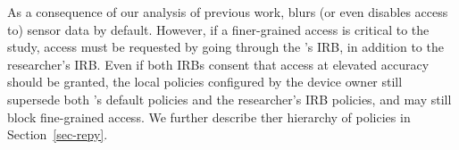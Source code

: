 \begin{comment}
\textbf{Default and customizable policies.}
For sensors of low and moderate risk, the default policies are listed in 
Table~\ref{tab:default}. Our principle to design the the default policies 
is that a device or its owner cannot be identifiable, but research projects
are allowed to get data at a level that is meaningful. For example, Bluetooth
and WiFi network MAC addresses can uniquely identify a device, therefore, 
the default policy for these sensor data is to return randomized MAC 
addresses to an experiment, as in~\cite{aditya2014encore}, and ther is 
mandatory (marked by N/A). For research projects that are interested 
in monitoring human activity, wireless network performance, etc., sensor
values are allowed to the granularity that is safe. Some data can be 
accessed at full precision (cellular signal strength, WiFi link speed), 
whereas others have an upper bound on their access frequency. 
\yanyan{how to add frequency to the table?}

\end{comment}


As a consequence of our analysis of previous work, \sysname blurs (or 
even disables access to) sensor data by default.
However, if a finer-grained access is critical to the study, access 
must be requested by going through the \sysname's IRB, in addition to the 
researcher's IRB. Even if both IRBs consent that access at elevated accuracy 
should be granted, the local policies configured by the device owner still 
supersede both \sysname's default policies and the researcher's IRB policies, 
and may still block fine-grained access. We further describe ther hierarchy 
of policies in Section~\ref{sec-repy}.

